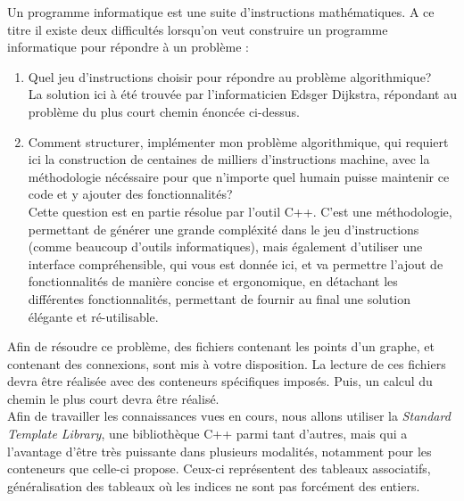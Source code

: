\documentclass[9pts]{article}
\begin{document}
Un programme informatique est une suite d'instructions mathématiques. A ce titre il existe deux difficultés lorsqu'on veut construire un programme informatique pour répondre à un problème :
\begin{enumerate}
\item Quel jeu d'instructions choisir pour répondre au problème algorithmique?\\
La solution ici à été trouvée par l'informaticien Edsger Dijkstra, répondant au problème du plus court chemin énoncée ci-dessus.

\item Comment structurer, implémenter mon problème algorithmique, qui requiert ici la construction de centaines de milliers d'instructions machine, avec la méthodologie nécéssaire pour que n'importe quel humain puisse maintenir ce code et y ajouter des fonctionnalités?\\
Cette question est en partie résolue par l'outil C++. C'est une méthodologie, permettant de générer une grande compléxité dans le jeu d'instructions (comme beaucoup d'outils informatiques), mais également d'utiliser une interface compréhensible, qui vous est donnée ici, et va permettre l'ajout de fonctionnalités de manière concise et ergonomique, en détachant les différentes fonctionnalités, permettant de fournir au final une solution élégante et ré-utilisable.
\end{enumerate}


Afin de résoudre ce problème, des fichiers contenant les points d'un graphe, et contenant des connexions, sont mis à votre disposition. La lecture de ces fichiers devra être réalisée avec des conteneurs spécifiques imposés. Puis, un calcul du chemin le plus court devra être réalisé.\\

Afin de travailler les connaissances vues en cours, nous allons utiliser la \emph{Standard Template Library}, une bibliothèque C++ parmi tant d'autres, mais qui a l'avantage d'être très puissante dans plusieurs modalités, notamment pour les conteneurs que celle-ci propose. Ceux-ci représentent des tableaux associatifs, généralisation des tableaux où les indices ne sont pas forcément des entiers.\\
\end{document}
